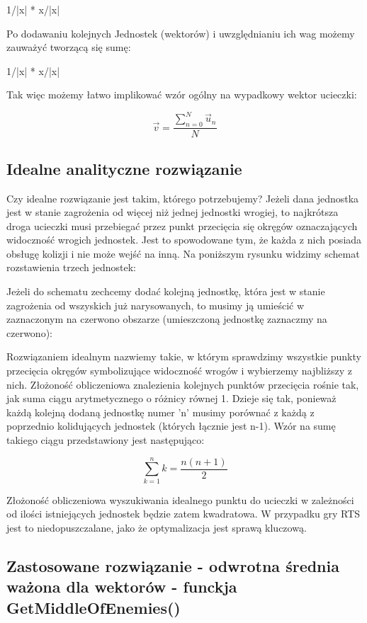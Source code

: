 \documentclass[12pt]{report}
\begin{document}
1/|x| * x/|x|

Po dodawaniu kolejnych Jednostek (wektorów) i uwzględnianiu ich wag możemy zauważyć tworzącą się sumę:




1/|x| * x/|x|

Tak więc możemy łatwo implikować wzór ogólny na wypadkowy wektor ucieczki:

$$\vec v = \dfrac{\sum_{n=0}^{N}  \vec u_n}{N}   $$

\subsection{Idealne analityczne rozwiązanie}

Czy idealne rozwiązanie jest takim, którego potrzebujemy?
Jeżeli dana jednostka jest w stanie zagrożenia od więcej niż jednej jednostki wrogiej, to najkrótsza droga ucieczki musi przebiegać przez punkt przecięcia się okręgów oznaczających widoczność wrogich jednostek. Jest to spowodowane tym, że każda z nich posiada obsługę kolizji i nie może wejść na inną.
Na poniższym rysunku widzimy schemat rozstawienia trzech jednostek:

Jeżeli do schematu zechcemy dodać kolejną jednostkę, która jest w stanie zagrożenia od wszyskich już narysowanych, to musimy ją umieścić w zaznaczonym na czerwono obszarze (umieszczoną jednostkę zaznaczmy na czerwono):

Rozwiązaniem idealnym nazwiemy takie, w którym sprawdzimy wszystkie punkty przecięcia okręgów symbolizujące widoczność wrogów i wybierzemy najbliższy z nich. Złożoność obliczeniowa znalezienia kolejnych punktów przecięcia rośnie tak, jak suma ciągu arytmetycznego o różnicy równej 1. Dzieje się tak, ponieważ każdą kolejną dodaną jednostkę numer 'n' musimy porównać z każdą z poprzednio kolidujących jednostek (których łącznie jest n-1). Wzór na sumę takiego ciągu przedstawiony jest następująco: 

$$\sum\limits_{k=1}^n k = \frac{n(n+1)}{2}$$

Złożoność obliczeniowa wyszukiwania idealnego punktu do ucieczki w zależności od ilości istniejących jednostek będzie zatem kwadratowa. W przypadku gry RTS jest to niedopuszczalane, jako że optymalizacja jest sprawą kluczową.


\subsection{Zastosowane rozwiązanie - odwrotna średnia ważona dla wektorów - funckja GetMiddleOfEnemies()}
\end{document}
